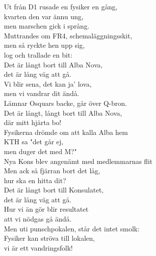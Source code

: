 \documentclass[a6paper, 10pt, twoside]{article}
\begin{document}
\noindent
\begin{center}
\end{center}
\begin{lyrics}
Ut från D1 rusade en fysiker en gång, \\
kvarten den var ännu ung, \\men marschen gick i språng. \\
Muttrandes om FR4, schemaläggningsskit, \\
men så ryckte hen upp sig, \\log och trallade en bit:
\vspace{5pt} \\
Det är långt bort till Alba Nova, \\
det är lång väg att gå. \\
Vi blir sena, det kan ja’ lova, \\ 
men vi vandrar dit ändå. \\
Lämnar Osquars backe, går över Q-bron. \\
Det är långt, långt bort till Alba Nova, \\
där mitt hjärta bo!
\vspace{5pt} \\
Fysikerna drömde om att kalla Alba hem \\
KTH sa "det går ej, \\ men duger det med M?" \\
Nya Kons blev angenämt med medlemmarnas flit \\
Men ack så fjärran bort det låg, \\hur ska en hitta dit?
\vspace{5pt} \\
Det är långt bort till Konsulatet, \\
det är lång väg att gå. \\
Hur vi än gör blir resultatet \\
att vi nödgas gå ändå. \\
Men uti punschpokalen, står det intet smolk: \\
Fysiker kan ströva till lokalen, \\
vi är ett vandringsfolk!
\end{lyrics}
\end{document}
